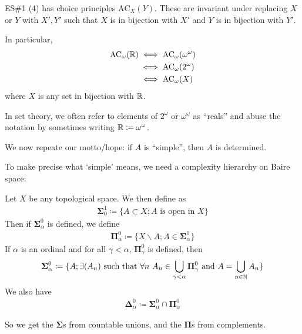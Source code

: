 \documentclass[]{article}
\newcommand{\om}{\omega}
\renewcommand{\ac}{\textrm{AC}}
\newcommand{\bosig}{\bm{\Sigma}}
\newcommand{\bopi}{\bm{\Pi}}
\newcommand{\bodel}{\bm{\Delta}}
\begin{document}
\begin{remark*}[Example]
    ES\#1 (4) has choice principles $\textrm{AC}_X(Y)$. These are invariant under replacing $X$ or $Y$ with $X',Y'$ such that $X$ is in bijection with $X'$ and $Y$ is in bijection with $Y'$.

    In particular,
    \begin{align*}
        \textrm{AC}_\om(\R) &\iff \ac_\om(\om^\om)\\
        &\iff \ac_\om(2^\om)\\
        &\iff \ac_\om(X)
    \end{align*}
    where $X$ is any set in bijection with $\mathbb{R}$.
\end{remark*}

In set theory, we often refer to elements of $2^\om$ or $\om^\om$ as ``reals'' and abuse the notation by sometimes writing $\R \coloneqq \om^\om$.

We now repeate our motto/hope: if $A$ is ``simple'', then $A$ is determined.

To make precise what `simple' means, we need a complexity hierarchy on Baire space:

\begin{defin*}
    Let $X$ be any topological space. We then define  as
    \begin{align*}
        \bm{\Sigma}_{0}^{1}\coloneqq \{A\subset X; A\textrm{ is open in }X\}
    \end{align*}
    Then if $\bm{\Sigma}^0_\alpha$ is defined, we define
    \begin{align*}
        \bm{\Pi}^0_\alpha \coloneqq \{X\backslash A; A \in \bm{\Sigma}^0_\alpha \}
    \end{align*}
    If $\alpha$ is an ordinal and for all $\gamma < \alpha$, $\bopi^0_\gamma$ is defined, then
    \begin{align*}
        \bosig^0_\alpha \coloneqq \{A; \exists (A_n)\textrm{ such that }\forall n\ A_n\in \bigcup_{\gamma<\alpha}\bopi^0_\gamma\textrm{ and }A = \bigcup_{n\in\N}A_n\}
    \end{align*}
    We also have
    \begin{align*}
        \bodel^0_\alpha \coloneqq \bosig^0_\alpha \cap \bopi^0_\alpha
    \end{align*}

    So we get the $\bosig$s from countable unions, and the $\bopi$s from complements.
\end{defin*}
\end{document}

